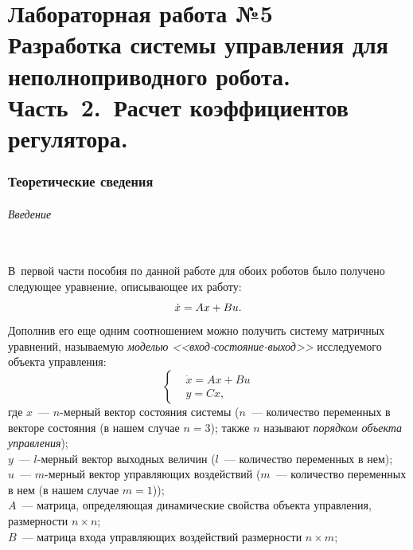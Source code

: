 \documentclass[12pt,a4paper,openany]{extarticle}
\begin{document}
\renewcommand{\themyappcounter}{\Alph{myappcounter}}
\newcommand{\myappnum}{\refstepcounter{myappcounter}\themyappcounter}

\part*{Лабораторная работа №5\\
Разработка системы управления для неполноприводного робота.\\ {\LARGE Часть~2.~Расчет коэффициентов регулятора.}}

\section{Теоретические сведения}

\paragraph*{Введение}$\phantom{-}$\\
\hspace*{\parindent}В~первой части пособия по данной работе для обоих роботов было получено следующее уравнение, описывающее их работу:
\begin{equation}\label{dx=Ax+Bu}
	\dot x = Ax + Bu\ldotp
\end{equation}
Дополнив его еще одним соотношением можно получить систему матричных уравнений, называемую \textit{моделью <<вход-состояние-выход>>} исследуемого объекта управления:
\begin{equation}
	\left\{
	\begin{aligned}
		\!&\dot x = Ax + Bu \\
		\!&y = Cx,
	\end{aligned}
	\right.
\end{equation}
где 
$x$~--- $n$-мерный вектор состояния системы ($n$~--- количество переменных в векторе состояния (в нашем случае $n=3$); также $n$ называют \textit{порядком объекта управления}); \\
$y$~--- $l$-мерный вектор выходных величин ($l$~--- количество переменных в нем);\\
$u$~--- $m$-мерный вектор управляющих воздействий ($m$~--- количество переменных в нем (в нашем случае $m=1$));\\
$A$~--- матрица, определяющая динамические свойства объекта управления, размерности $n\times n$;\\
$B$~--- матрица входа управляющих воздействий размерности $n\times m$;\\
\end{document}
